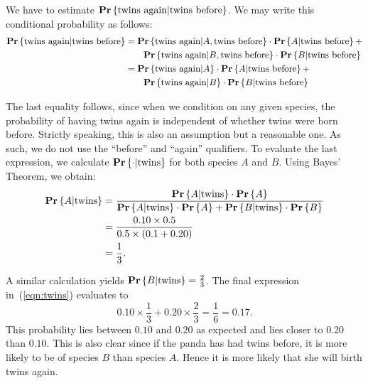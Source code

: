 \begin{solution}
We have to estimate $\mathbf{Pr} \left \{ \text{twins again} \vert \text{twins before} \right \}$. 
We may write this conditional probability as follows:
\begin{align} \label{eqn:twins}
    \mathbf{Pr} \left \{ \text{twins again} \vert \text{twins before} \right \} & = 
        \mathbf{Pr} \left \{ \text{twins again} \vert A, \text{twins before} \right \} \cdot 
        \mathbf{Pr} \left \{ A \vert \text{twins before} \right \} + \nonumber \\
        & \quad \quad 
        \mathbf{Pr} \left \{ \text{twins again} \vert B, \text{twins before} \right \} \cdot 
        \mathbf{Pr} \left \{ B \vert \text{twins before} \right \} \nonumber \\
        & = \mathbf{Pr} \left \{ \text{twins again} \vert A \right \} \cdot 
        \mathbf{Pr} \left \{ A \vert \text{twins before} \right \} + \nonumber\\
        & \quad \quad 
        \mathbf{Pr} \left \{ \text{twins again} \vert B \right \} \cdot 
        \mathbf{Pr} \left \{ B \vert \text{twins before} \right \}
\end{align}

The last equality follows, since when we condition on any given species, 
the probability of having twins again is independent of whether twins 
were born before. Strictly speaking, this is also an assumption but a reasonable 
one. As such, we do not use the ``before'' and ``again'' 
qualifiers. To evaluate the last expression, we calculate 
$\mathbf{Pr} \left \{  \cdot \vert \text{twins} \right \}$ for both species $A$ and $B$.  Using 
Bayes' Theorem, we obtain:
\begin{align*}
    \mathbf{Pr} \left \{ A \vert \text{twins} \right \} & = 
        \frac{\mathbf{Pr} \left \{ A \vert \text{twins} \right \} \cdot \mathbf{Pr} \left \{ A \right \}}
             {\mathbf{Pr} \left \{ A \vert \text{twins} \right \} \cdot \mathbf{Pr} \left \{ A \right \} + \mathbf{Pr} \left \{ B \vert \text{twins} \right \} \cdot \mathbf{Pr} \left \{ B \right \}} \\
        & = \frac{0.10 \times 0.5}{0.5 \times (0.1 + 0.20)} \\
        & = \frac{1}{3}.
\end{align*}

A similar calculation yields $\mathbf{Pr} \left \{ B \vert \text{twins} \right \} = \frac{2}{3}$. The 
final expression in~(\ref{eqn:twins}) evaluates to 
\[
0.10 \times \frac{1}{3} + 0.20 \times \frac{2}{3} = \frac{1}{6} = 0.17.
\]
This probability lies between $0.10$ and $0.20$ as expected and lies closer 
to $0.20$ than $0.10$. This is also clear since if the panda has had twins before, 
it is more likely to be of species $B$ than species $A$. Hence it is more likely
that she will birth twins again.
\end{solution}

